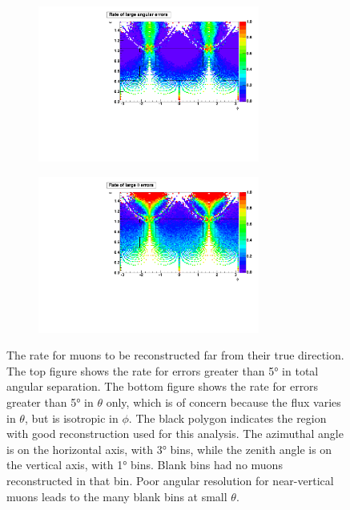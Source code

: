 \documentclass[herrin-thesis.tex]{subfiles}
\begin{document}
 \begin{figure}[htp]
 \centering
 \begin{subfigure}[b]{1.0\textwidth}
 \centering
 \includegraphics[width=0.8\textwidth]{./plots/muon_misrecon_ang_rate.pdf}
 \end{subfigure}
  \begin{subfigure}[b]{1.0\textwidth}
  \centering
   \includegraphics[width=0.8\textwidth]{./plots/muon_misrecon_theta_rate.pdf}
  \end{subfigure}
 \caption[Rate of poorly reconstructed muons]{The rate for muons to be reconstructed far from their true direction. The top figure shows the rate for  errors greater than \ang{5} in total angular separation. The bottom figure shows the rate for errors greater than \ang{5} in \(\theta\) only, which is of concern because the flux varies in \(\theta\), but is isotropic in \(\phi\). The black polygon indicates the region with good reconstruction used for this analysis. The azimuthal angle is on the horizontal axis, with \ang{3} bins, while the zenith angle is on the vertical axis, with \ang{1} bins. Blank bins had no muons reconstructed in that bin. Poor angular resolution for near-vertical muons leads to the many blank bins at small \(\theta\).}
 \label{fig:muon_misrecon_rate}
 \end{figure}
\end{document}
